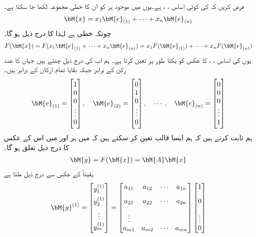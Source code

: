 فرض کریں کہ  کی کوئی اساس ، ،  ہے۔یوں  میں موجود ہر  کو ان کا خطی مجموعہ لکھا جا سکتا ہے۔
\begin{align*}
\bM{x}=x_1\bM{e}_{(1)}+\cdots+x_n\bM{e}_{(n)}
\end{align*}
چونکہ  خطی ہے لہٰذا  کا   درج ذیل ہو گا۔
\begin{align*}
F(\bM{x})=F(x_1\bM{e}_{(1)}+\cdots+x_n\bM{e}_{(n)})=x_1F(\bM{e}_{(1)})+\cdots+x_nF(\bM{e}_{(n)})
\end{align*}
یوں  کی اساس ، ،  کا عکس   کو یکتا طور پر تعین کرتا ہے۔ ہم اب  کی درج ذیل  چنتے ہیں جہاں  کا  عدد رکن   کے برابر جبکہ بقایا تمام ارکان  کے برابر ہیں۔
\begin{align}
\bM{e}_{(1)}=\begin{bmatrix} 1\\ 0\\ 0\\ \vdots\\0 \end{bmatrix}, \quad \bM{e}_{(2)}=\begin{bmatrix} 0\\ 1\\ 0\\ \vdots\\0 \end{bmatrix}, \quad \cdots, \quad \bM{e}_{(n)}=\begin{bmatrix} 0\\ 0\\ 0\\ \vdots\\1 \end{bmatrix}
\end{align}
ہم ثابت کرتے ہیں کہ ہم ایسا  قالب  تعین کر سکتے ہیں کہ  میں ہر   اور  میں اس کے عکس  کا درج ذیل تعلق ہو گا۔
\begin{align}
\bM{y}=F(\bM{x})=\bM{A}\bM{x}
\end{align}
یقیناً  کے عکس  سے درج ذیل ملتا ہے
\begin{align*}
\bM{y}^{(1)}=\begin{bmatrix} y_1^{(1)}\\[1ex]y_2^{(1)}\\[1ex]  \vdots \\ y_m^{(1)} \end{bmatrix}=\begin{bmatrix} a_{11}&a_{12}&\cdots&a_{1n}\\[2ex]
a_{21}&a_{22}&\cdots&a_{2n}\\[2ex]  \vdots\\a_{m1}&a_{m2}&\cdots &a_{mn} \end{bmatrix} \begin{bmatrix}1\\[2ex]0\\[2ex]  \vdots\\ 0  \end{bmatrix}
\end{align*}
